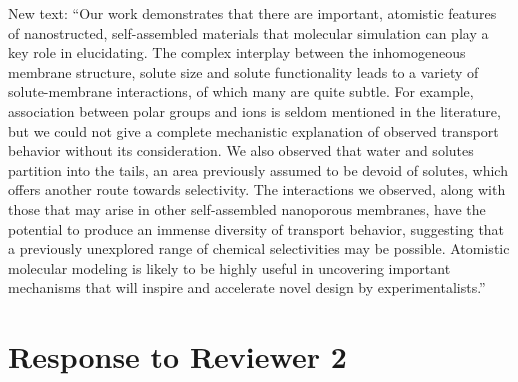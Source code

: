 \documentclass{article}
\begin{document}
\begin{enumerate}
    New text: ``Our work demonstrates that there are important, atomistic features of nanostructed, 
    self-assembled materials that molecular simulation can play a key role in elucidating.
    The complex interplay between the inhomogeneous membrane structure, solute size and 
    solute functionality leads to a variety of solute-membrane interactions, of which many
    are quite subtle. For example, association between polar groups and ions is seldom 
    mentioned in the literature, but we could not give a complete mechanistic explanation
    of observed transport behavior without its consideration. 
    We also observed that water and solutes partition into the tails, an area previously 
    assumed to be devoid of solutes, which offers another route towards selectivity.
    The interactions we observed, along with those that may arise in other self-assembled
    nanoporous membranes, have the potential to produce an immense diversity of transport
    behavior, suggesting that a previously unexplored range of chemical selectivities may
    be possible. Atomistic molecular modeling is likely to be highly useful in uncovering 
    important mechanisms that will inspire and accelerate novel design by experimentalists.''
	
\end{enumerate}

\section*{Response to Reviewer 2}
\end{document}
